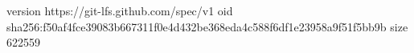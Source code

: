version https://git-lfs.github.com/spec/v1
oid sha256:f50af4fce39083b667311f0e4d432be368eda4c588f6df1e23958a9f51f5bb9b
size 622559
